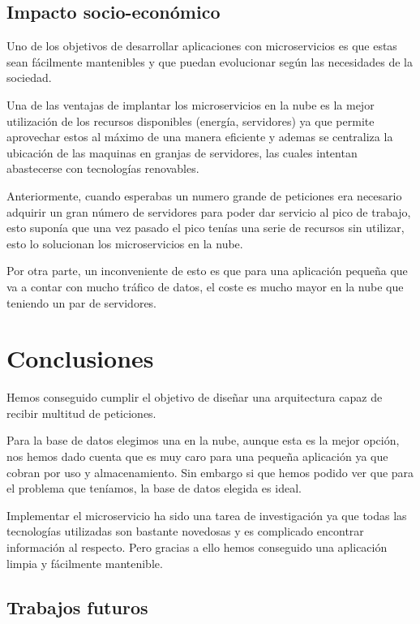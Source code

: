 \documentclass[12pt]{report} %
\begin{document}
\section{Impacto socio-económico}

Uno de los objetivos de desarrollar aplicaciones con microservicios es que estas sean fácilmente mantenibles y que puedan evolucionar según las necesidades de la sociedad.

Una de las ventajas de implantar los microservicios en la nube es la mejor utilización de los recursos disponibles (energía, servidores) ya que permite aprovechar estos al máximo de una manera eficiente y ademas  se centraliza la ubicación de las maquinas en granjas de servidores, las cuales intentan abastecerse con tecnologías renovables.

Anteriormente, cuando esperabas un numero grande de peticiones era necesario adquirir un gran número de servidores para poder dar servicio al pico de trabajo, esto suponía que una vez pasado el pico tenías una serie de recursos sin utilizar, esto lo solucionan los microservicios en la nube.

Por otra parte, un inconveniente de esto es que para una aplicación pequeña que va a contar con mucho tráfico de datos, el coste es mucho mayor en la nube que teniendo un par de servidores.

\chapter{Conclusiones}

Hemos conseguido cumplir el objetivo de diseñar una arquitectura capaz de recibir multitud de peticiones.

Para la base de datos elegimos una en la nube, aunque esta es la mejor opción, nos hemos dado cuenta que es muy caro para una pequeña aplicación ya que cobran por uso y almacenamiento. Sin embargo si que hemos podido ver que para el problema que teníamos, la base de datos elegida es ideal.

Implementar el microservicio ha sido una tarea de investigación ya que todas las tecnologías utilizadas son bastante novedosas y es complicado encontrar información al respecto. Pero gracias a ello hemos conseguido una aplicación limpia y fácilmente mantenible.

\section{Trabajos futuros}
\end{document}
